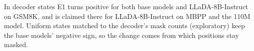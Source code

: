 In decoder states E1 turns positive for both base models and LLaDA-8B-Instruct on GSM8K, and is
claimed there for LLaDA-8B-Instruct on MBPP and the 110M model. Uniform states matched to the
decoder's mask counts (exploratory) keep the base models' negative sign, so the change comes
from which positions stay masked.


